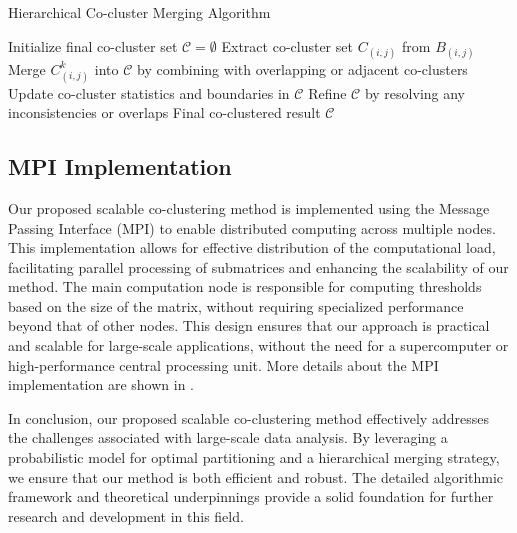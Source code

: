 \documentclass[journal]{IEEEtran}
\begin{document}
\begin{algorithm}[!t]
  \caption{Hierarchical Co-cluster Merging Algorithm}\label{alg:hierarchical_merging}
  \begin{algorithmic}[1]
    \STATE Initialize final co-cluster set $\mathcal{C} = \emptyset$
      \STATE Extract co-cluster set $C_{(i,j)}$ from $B_{(i,j)}$
        \STATE Merge $C_{(i,j)}^k$ into $\mathcal{C}$ by combining with overlapping or adjacent co-clusters
        \STATE Update co-cluster statistics and boundaries in $\mathcal{C}$
      \ENDFOR
    \ENDFOR
    \STATE Refine $\mathcal{C}$ by resolving any inconsistencies or overlaps
    \RETURN Final co-clustered result $\mathcal{C}$
  \end{algorithmic}
\end{algorithm}

\subsection{MPI Implementation}

Our proposed scalable co-clustering method is implemented using the Message Passing Interface (MPI) to enable distributed computing across multiple nodes. This implementation allows for effective distribution of the computational load, facilitating parallel processing of submatrices and enhancing the scalability of our method. The main computation node is responsible for computing thresholds based on the size of the matrix, without requiring specialized performance beyond that of other nodes. This design ensures that our approach is practical and scalable for large-scale applications, without the need for a supercomputer or high-performance central processing unit.
More details about the MPI implementation are shown in .

In conclusion, our proposed scalable co-clustering method effectively addresses the challenges associated with large-scale data analysis. By leveraging a probabilistic model for optimal partitioning and a hierarchical merging strategy, we ensure that our method is both efficient and robust. The detailed algorithmic framework and theoretical underpinnings provide a solid foundation for further research and development in this field.
\end{document}
